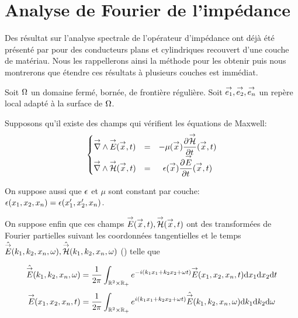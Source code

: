 \section{Analyse de Fourier de l'impédance}

Des résultat sur l'analyse spectrale de l'opérateur d'impédance ont déjà été présenté par \cite{hoppe_impedance_1995} pour des conducteurs plans et cylindriques recouvert d'une couche de matériau.
Nous les rappellerons ainsi la méthode pour les obtenir puis nous montrerons que étendre ces résultats à plusieurs couches est immédiat. 


Soit \(\Omega\) un domaine fermé, bornée, de frontière régulière. Soit \({\overset{\rightarrow}{e_1}},{\overset{\rightarrow}{e_2}},{\overset{\rightarrow}{e_n}}\) un repère local adapté à la surface de \(\Omega\).

Supposons qu'il existe des champs  qui vérifient les équations de Maxwell:
\begin{equation}
    \left\lbrace
    \begin{matrix}
    {\overset{\rightarrow}{\nabla}}\wedge {\overset{\rightarrow}{E}}({\overset{\rightarrow}{x}},t) &=& -\mu({\overset{\rightarrow}{x}}) \dfrac{\partial^{{}} {\overset{\rightarrow}{\mathcal{H}}}}{{\partial t}^{{}}}({\overset{\rightarrow}{x}},t) \\
    {\overset{\rightarrow}{\nabla}}\wedge {\overset{\rightarrow}{\mathcal{H}}}({\overset{\rightarrow}{x}},t) &=& \epsilon({\overset{\rightarrow}{x}}) \dfrac{\partial^{{}} {\overset{\rightarrow}{E}}}{{\partial t}^{{}}}({\overset{\rightarrow}{x}},t)
    \end{matrix}
    \right.
\end{equation}

On suppose aussi que \(\epsilon\) et \(\mu\) sont constant par couche: \(\epsilon(x_1,x_2,x_n)=\epsilon(x_1',x_2',x_n)\).

On suppose enfin que ces champs \({\overset{\rightarrow}{E}}({\overset{\rightarrow}{x}},t),{\overset{\rightarrow}{\mathcal{H}}}({\overset{\rightarrow}{x}},t)\) ont des transformées de Fourier partielles suivant les coordonnées tangentielles et le temps \(\hat{{\overset{\rightarrow}{E}}}(k_1,k_2,x_n,\omega), \hat{{\overset{\rightarrow}{\mathcal{H}}}}(k_1,k_2,x_n,\omega)\) (\cite[Théorème de Plancherel, p.~153]{yosida_functional_1995}) telle que

\begin{equation}
    \hat{{\overset{\rightarrow}{E}}} (k_1,k_2,x_n,\omega) = \dfrac{1}{2\pi}\int_{\mathbb R^2\times\mathbb R_+} e^{-i(k_1x_1+k_2x_2+\omega t)}{\overset{\rightarrow}{E}}(x_1,x_2,x_n,t) \mathrm{d}{x_1}\mathrm{d}{x_2}\mathrm{d}{t}
\end{equation}
\begin{equation}
    {\overset{\rightarrow}{E}}(x_1,x_2,x_n,t) = \dfrac{1}{2\pi}\int_{\mathbb R^2\times\mathbb R_+} e^{i(k_1x_1+k_2x_2+\omega t)}\hat{{\overset{\rightarrow}{E}}} (k_1,k_2,x_n,\omega) \mathrm{d}{k_1}\mathrm{d}{k_2} \mathrm{d}{\omega}
\end{equation}

